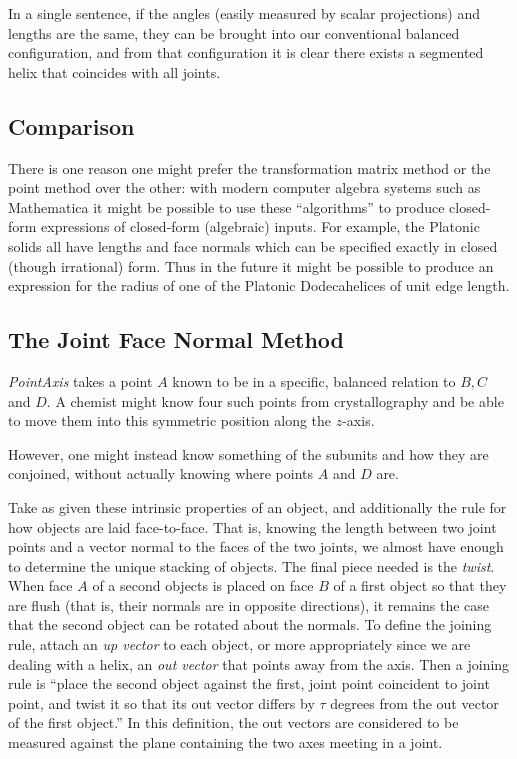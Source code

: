 \documentclass[mathematics,article,submit,pdftex,moreauthors]{Definitions/mdpi}
\begin{document}
In a single sentence, if the angles (easily measured by scalar projections) and lengths are the same,
they can be brought into our conventional balanced configuration,
and from that configuration it is clear there exists a segmented helix that coincides with all joints.

\subsection{Comparison}

There is one reason one might prefer the transformation matrix method or the point method over the other: with modern
computer algebra systems such as Mathematica \cite{Mathematica} it might be possible to use these ``algorithms'' to produce closed-form
expressions of closed-form (algebraic) inputs. For example, the Platonic solids all have lengths and face normals which
can be specified exactly in closed (though irrational) form.
Thus in the future it might be possible to produce an expression for the
radius of one of the Platonic Dodecahelices of unit edge length.


\subsection{The Joint Face Normal Method}
\label{sec:facenormal}

{\em PointAxis} takes a point $A$ known to be in a specific, balanced relation
to $B, C$ and $D$. A chemist might know four such points from crystallography
and be able to move them into this symmetric position along the $z$-axis.

However, one might instead know something of the subunits and
how they are conjoined, without actually knowing where points $A$
and $D$ are.

Take as given these intrinsic properties of an object, and additionally the
rule for how objects are laid face-to-face. That is, knowing the length between two
joint points and a vector normal to the faces of the two joints, we almost have
enough to determine the unique stacking of objects. The final piece
needed is
the {\em twist}. When face $A$ of a second objects is placed on face $B$
of a first object so that they are flush (that is, their normals are in opposite directions),
it remains the case that the second object can be rotated about the normals. To
define the joining rule, attach an {\em up vector} to each object, or more appropriately
since we are dealing with a helix, an {\em out vector} that points away from the axis.
Then a joining
rule is ``place the second object against the first, joint point coincident to joint point,
and twist it so that its out vector differs by $\tau$ degrees from the out vector of the first
object.'' In this definition, the out vectors are considered to be measured against the plane
containing the two axes meeting in a joint.
\end{document}
